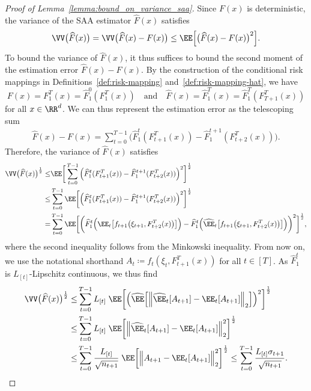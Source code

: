 \documentclass[11pt]{article}
\let\hat\widehat
\begin{document}
\begin{proof}[Proof of Lemma~\ref{lemma:bound_on_variance_saa}] 
Since $F(x)$ is deterministic, the variance of the SAA estimator $\hat F(x)$ satisfies
\begin{align*}
    \VV \big( \hat{F}(x) \big)= \VV \big( \hat{F}(x) - F(x) \big) \leq \EE\Big[ \big(\hat{F}(x) -F(x) \big)^2 \Big].
\end{align*}
To bound the variance of $\hat F(x)$, it thus suffices to bound the second moment of the estimation error $\hat{F}(x) -F(x)$.  By the construction of the conditional risk mappings in Definitions~\ref{def:risk-mapping} and~\ref{def:risk-mapping-hat}, we have 
\[
    F(x) = F_1^T(x) = \hat F_1^0(F_1^T(x)) \quad \text{and} \quad \hat{F}(x) = \hat F_1^T(x) = \hat F_1^T(F_{T+1}^T(x))
\]
for all $x\in\RR^d$. We can thus represent the estimation error as the telescoping sum 
\begin{align*}
     \hat{F}(x) - F(x)=\sum_{t=0}^{T-1} \Big(\hat F_1^t(F_{t+1}^T(x)) - \hat F_1^{t+1}(F_{t+2}^T(x))\Big).
\end{align*}
Therefore, the variance of $\hat{F}(x)$ satisfies
\begin{align*}
    \VV \big( \hat{F}(x) \big)^{\frac{1}{2}} \leq &  \EE\bigg[\sum_{t=0}^{T-1} \Big( \hat F_1^t(F_{t+1}^T(x)) - \hat F_1^{t+1}(F_{t+2}^T(x)) \Big)^2\bigg]^\frac{1}{2}\\
    \leq & \sum_{t=0}^{T-1} \EE\bigg[ \Big(\hat F_1^t(F_{t+1}^T(x)) - \hat F_1^{t+1}(F_{t+2}^T(x))\Big)^2\bigg]^\frac{1}{2}\\
    = & \sum_{t=0}^{T-1} \EE\bigg[ \bigg(\hat F_1^t \Big( \EE_t\big[ f_{t+1}\big( \xi_{t+1}, F_{t+2}^T(x) \big) \big] \Big) - \hat F_1^t \Big( \hat \EE_t\big[ f_{t+1}\big( \xi_{t+1}, F_{t+2}^T(x) \big) \big] \Big) \bigg)^2\bigg]^\frac{1}{2},
\end{align*}
where the second inequality follows from the Minkowski inequality. From now on, we use the notational shorthand $A_t\coloneqq f_{t}(\xi_{t}, F_{t+1}^T(x))$ for all $t\in[T]$. As $\hat{F}_1^t$ is $L_{[t]}$-Lipschitz continuous, we thus find
  \begin{align*}
    \VV \big( \hat{F}(x) \big)^{\frac{1}{2}} \leq & \sum_{t=0}^{T-1} L_{[t]}\; \EE\bigg[ \Big(\hat \EE\Big[\Big\|\hat \EE_t[ A_{t+1} ]- \EE_t [A_{t+1} ]\Big\|_2\Big]\Big)^2 \bigg]^\frac{1}{2}\\
    \leq &\sum_{t=0}^{T-1} L_{[t]}\; \EE\bigg[ \Big\|\hat \EE_t[ A_{t+1} ]- \EE_t [A_{t+1} ]\Big\|_2^2 \bigg]^\frac{1}{2} \\
    \leq &  \sum_{t=0}^{T-1} \frac{L_{[t]}}{\sqrt{n_{t+1}}}\; \EE\bigg[ \Big\|A_{t+1}- \EE_t [A_{t+1} ]\Big\|_2^2 \bigg]^\frac{1}{2}\leq \sum_{t=0}^{T-1} \frac{L_{[t]}\sigma_{t+1}}{\sqrt{n_{t+1}}}.

\end{align*}
\end{proof}
\end{document}
